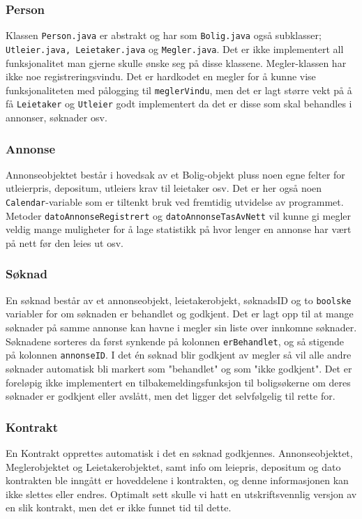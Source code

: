 \subsubsection{Person}
Klassen \texttt{Person.java} er abstrakt og har som \texttt{Bolig.java} også subklasser; \texttt{Utleier.java, Leietaker.java} og \texttt{Megler.java}.
Det er ikke implementert all funksjonalitet man gjerne skulle ønske seg på disse klassene. Megler-klassen har ikke noe registreringsvindu. Det er hardkodet en megler for å kunne vise funksjonaliteten med pålogging til \texttt{meglerVindu}, men det er lagt større vekt på å få \texttt{Leietaker} og \texttt{Utleier} godt implementert da det er disse som skal behandles i annonser, søknader osv.

\subsubsection{Annonse}
Annonseobjektet består i hovedsak av et Bolig-objekt pluss noen egne felter for utleierpris, depositum, utleiers krav til leietaker osv.
Det er her også noen \texttt{Calendar}-variable som er tiltenkt bruk ved fremtidig utvidelse av programmet. Metoder \texttt{datoAnnonseRegistrert} og \texttt{datoAnnonseTasAvNett} vil kunne gi megler veldig mange muligheter for å lage statistikk på hvor lenger en annonse har vært på nett før den leies ut osv. 

\subsubsection{Søknad}
En søknad består av et annonseobjekt, leietakerobjekt, søknadsID og to \texttt{boolske} variabler for om søknaden er behandlet og godkjent.
Det er lagt opp til at mange søknader på samme annonse kan havne i megler sin liste over innkomne søknader. Søknadene sorteres da først synkende på kolonnen \texttt{erBehandlet}, og så stigende på kolonnen \texttt{annonseID}.
I det én søknad blir godkjent av megler så vil alle andre søknader automatisk bli markert som "behandlet" og som "ikke godkjent". 
Det er foreløpig ikke implementert en tilbakemeldingsfunksjon til boligsøkerne om deres søknader er godkjent eller avslått, men det ligger det selvfølgelig til rette for.

\subsubsection{Kontrakt}
En Kontrakt opprettes automatisk i det en søknad godkjennes. Annonseobjektet, Meglerobjektet og Leietakerobjektet, samt info om leiepris, depositum og dato kontrakten ble inngått er hoveddelene i kontrakten, og denne informasjonen kan ikke slettes eller endres. 
Optimalt sett skulle vi hatt en utskriftsvennlig versjon av en slik kontrakt, men det er ikke funnet tid til dette. 


